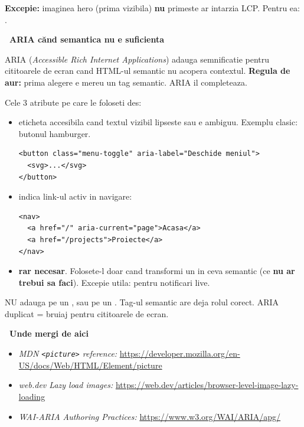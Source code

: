 \begin{bonusbox}
\textbf{Excepie:} imaginea hero (prima vizibila) \textbf{nu} primeste  \textendash{} ar intarzia LCP. Pentru ea: .

\medskip

\textbf{\faUniversalAccess\ ARIA \textendash{} c\u and semantica nu e suficienta}

ARIA (\emph{Accessible Rich Internet Applications}) adauga semnificatie pentru cititoarele de ecran cand HTML-ul semantic nu acopera contextul. \textbf{Regula de aur:} prima alegere e mereu un tag semantic. ARIA il completeaza.

Cele 3 atribute pe care le foloseti des:

\begin{itemize}[itemsep=2pt]
  \item {} \textendash{} eticheta accesibila cand textul vizibil lipseste sau e ambiguu. Exemplu clasic: butonul hamburger.
\begin{lstlisting}[style=html, numbers=none]
<button class="menu-toggle" aria-label="Deschide meniul">
  <svg>...</svg>
</button>
\end{lstlisting}

  \item {} \textendash{} indica link-ul activ in navigare:
\begin{lstlisting}[style=html, numbers=none]
<nav>
  <a href="/" aria-current="page">Acasa</a>
  <a href="/projects">Proiecte</a>
</nav>
\end{lstlisting}

  \item {} \textendash{} \textbf{rar necesar}. Folosete-l doar cand transformi un  in ceva semantic (ce \textbf{nu ar trebui sa faci}). Excepie utila:  pentru notificari live.
\end{itemize}

\begin{atentie}
NU adauga  pe un , sau  pe un . Tag-ul semantic are deja rolul corect. ARIA duplicat = bruiaj pentru cititoarele de ecran.
\end{atentie}

\medskip

\textbf{\faRoute\ Unde mergi de aici}

\begin{itemize}[itemsep=1pt]
  \item \emph{MDN \texttt{<picture>} reference:} \url{https://developer.mozilla.org/en-US/docs/Web/HTML/Element/picture}
  \item \emph{web.dev Lazy load images:} \url{https://web.dev/articles/browser-level-image-lazy-loading}
  \item \emph{WAI-ARIA Authoring Practices:} \url{https://www.w3.org/WAI/ARIA/apg/}
\end{itemize}
\end{bonusbox}

